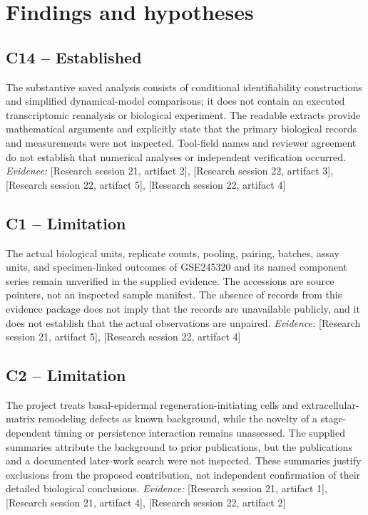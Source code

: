 \documentclass[11pt]{article}
\begin{document}
\section{Findings and hypotheses}
\begin{sloppypar}
\small
\subsection{C14 -- Established}
The substantive saved analysis consists of conditional identifiability constructions and simplified dynamical-model comparisons; it does not contain an executed transcriptomic reanalysis or biological experiment.
The readable extracts provide mathematical arguments and explicitly state that the primary biological records and measurements were not inspected. Tool-field names and reviewer agreement do not establish that numerical analyses or independent verification occurred.
\textit{Evidence: }[Research session 21, artifact 2], [Research session 22, artifact 3], [Research session 22, artifact 5], [Research session 22, artifact 4]
\subsection{C1 -- Limitation}
The actual biological units, replicate counts, pooling, pairing, batches, assay units, and specimen-linked outcomes of GSE245320 and its named component series remain unverified in the supplied evidence.
The accessions are source pointers, not an inspected sample manifest. The absence of records from this evidence package does not imply that the records are unavailable publicly, and it does not establish that the actual observations are unpaired.
\textit{Evidence: }[Research session 21, artifact 5], [Research session 22, artifact 4]
\subsection{C2 -- Limitation}
The project treats basal-epidermal regeneration-initiating cells and extracellular-matrix remodeling defects as known background, while the novelty of a stage-dependent timing or persistence interaction remains unassessed.
The supplied summaries attribute the background to prior publications, but the publications and a documented later-work search were not inspected. These summaries justify exclusions from the proposed contribution, not independent confirmation of their detailed biological conclusions.
\textit{Evidence: }[Research session 21, artifact 1], [Research session 21, artifact 4], [Research session 22, artifact 2]

\end{sloppypar}
\end{document}
